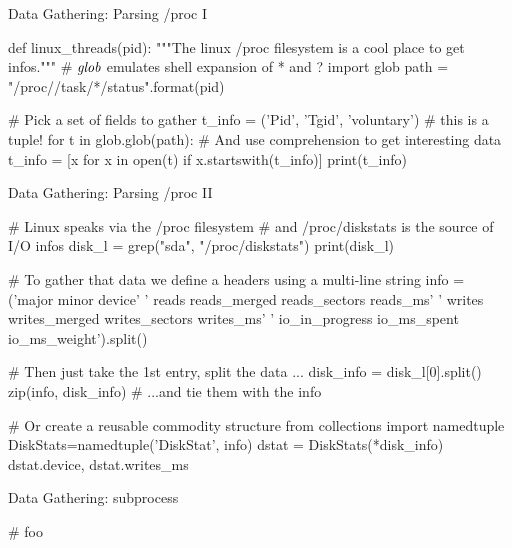 \begin{frame}[fragile]{Data Gathering: Parsing /proc I}
\begin{pythoncode}

def linux_threads(pid):
    """The linux /proc filesystem is a cool place 
        to get infos."""
    # $\emph{glob}$ emulates shell expansion of * and ?
    import glob
    path = "/proc/{}/task/*/status".format(pid)
    
    # Pick a set of fields to gather
    t_info = ('Pid', 'Tgid', 'voluntary')  # this is a tuple!
    for t in glob.glob(path):
        # And use comprehension to get interesting data
        t_info = [x for x in open(t) if x.startswith(t_info)]
        print(t_info)
\end{pythoncode}
\end{frame}



\begin{frame}[fragile]{Data Gathering: Parsing /proc II}
\begin{pythoncode}
# Linux speaks via the /proc filesystem
#  and /proc/diskstats is the source of I/O infos
disk_l = grep("sda", "/proc/diskstats")
print(disk_l)

# To gather that data we define a headers using a multi-line string
info = ('major minor device'
        ' reads reads_merged reads_sectors reads_ms'
        ' writes writes_merged writes_sectors writes_ms'
        ' io_in_progress io_ms_spent io_ms_weight').split()

# Then just take the 1st entry, split the data ...
disk_info = disk_l[0].split()
zip(info, disk_info)    # ...and tie them with the info

# Or create a reusable commodity structure
from collections import namedtuple
DiskStats=namedtuple('DiskStat', info)
dstat = DiskStats(*disk_info)
dstat.device, dstat.writes_ms
\end{pythoncode}
\end{frame}



\begin{frame}[fragile]{Data Gathering: subprocess}
\begin{pythoncode}
# foo
\end{pythoncode}
\end{frame}

